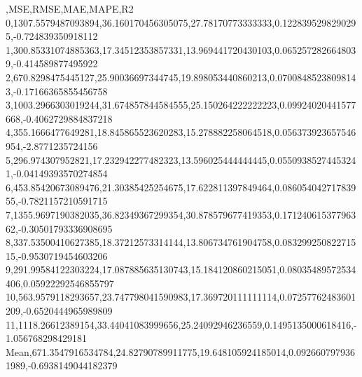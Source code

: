 ,MSE,RMSE,MAE,MAPE,R2
0,1307.5579487093894,36.160170456305075,27.78170773333333,0.1228395298290295,-0.724839350918112
1,300.85331074885363,17.34512353857331,13.969441720430103,0.0652572826648039,-0.414589877495922
2,670.8298475445127,25.90036697344745,19.898053440860213,0.07008485238098143,-0.17166365855456758
3,1003.2966303019244,31.674857844584555,25.150264222222223,0.09924020441577668,-0.4062729884837218
4,355.1666477649281,18.845865523620283,15.278882258064518,0.056373923657546954,-2.8771235724156
5,296.974307952821,17.232942277482323,13.596025444444445,0.05509385274453241,-0.04149393570274854
6,453.85420673089476,21.30385425254675,17.622811397849464,0.08605404271783955,-0.7821157210591715
7,1355.9697190382035,36.82349367299354,30.878579677419353,0.17124061537796362,-0.30501793336908695
8,337.53500410627385,18.37212573314144,13.806734761904758,0.08329925082271515,-0.9530719454603206
9,291.99584122303224,17.087885635130743,15.184120860215051,0.08035489572534406,0.05922292546855797
10,563.9579118293657,23.747798041590983,17.369720111111114,0.07257762483601209,-0.6520444965989809
11,1118.26612389154,33.44041083999656,25.24092946236559,0.1495135000618416,-1.056768298429181
Mean,671.3547916534784,24.82790789911775,19.648105924185014,0.0926607979361989,-0.6938149044182379
